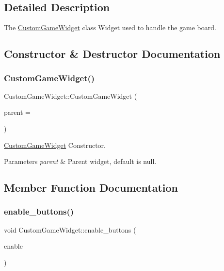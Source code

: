 \subsection{Detailed Description}
The \hyperlink{class_custom_game_widget}{Custom\+Game\+Widget} class Widget used to handle the game board. 

\subsection{Constructor \& Destructor Documentation}
\mbox{\label{class_custom_game_widget_a1c85b1e714a238a7afbcbb8dfa28f0b1}} 
\subsubsection{\texorpdfstring{Custom\+Game\+Widget()}{CustomGameWidget()}}
{\footnotesize\ttfamily Custom\+Game\+Widget\+::\+Custom\+Game\+Widget (\begin{DoxyParamCaption}\item[{Q\+Widget $\ast$}]{parent = {} }\end{DoxyParamCaption})\hspace{0.3cm}{\ttfamily [explicit]}}



\hyperlink{class_custom_game_widget}{Custom\+Game\+Widget} Constructor. 


\begin{DoxyParams}{Parameters}
{\em parent} & Parent widget, default is null. \\
\hline
\end{DoxyParams}


\subsection{Member Function Documentation}
\mbox{\label{class_custom_game_widget_abd589dcb5502f401773de7f1d349954a}} 
\subsubsection{\texorpdfstring{enable\+\_\+buttons()}{enable\_buttons()}}
{\footnotesize\ttfamily void Custom\+Game\+Widget\+::enable\+\_\+buttons (\begin{DoxyParamCaption}\item[{bool}]{enable }\end{DoxyParamCaption})}



